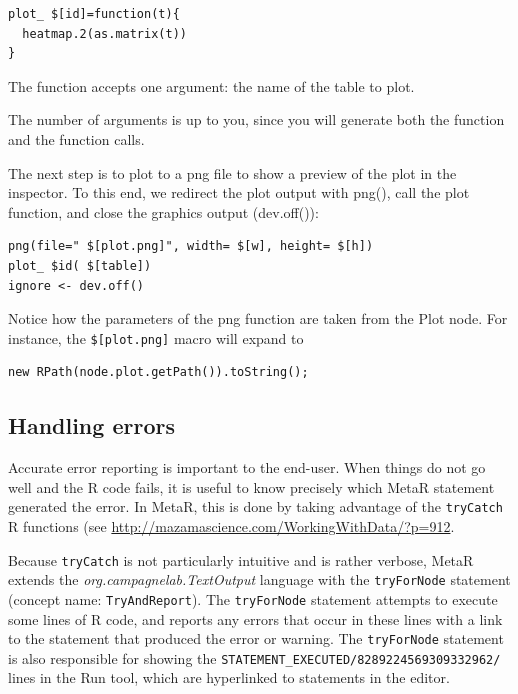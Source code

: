 \begin{lstlisting}
plot_ $[id]=function(t){                        
  heatmap.2(as.matrix(t)) 
}                                             
\end{lstlisting}

The function accepts one argument: the name of the table to plot. 

\begin{remark}
The number of arguments is up to you, since you will generate both the function and the function calls.

\end{remark}

The next step is to plot to a png file to show a preview of the plot in the inspector. To this end, we redirect the plot output with png(), call the plot function, and close the graphics output (dev.off()):

\begin{lstlisting}
png(file=" $[plot.png]", width= $[w], height= $[h])
plot_ $id( $[table])                           
ignore <- dev.off()                          
\end{lstlisting}
Notice how the parameters of the png function are taken from the Plot node.
For instance, the \texttt{\$[plot.png]} macro will expand to 

\begin{lstlisting}
new RPath(node.plot.getPath()).toString();
\end{lstlisting}


\subsection{Handling errors}
Accurate error reporting is important to the end-user. When things do not go well and the R code fails, it is useful to know precisely which MetaR statement generated the error. In MetaR, this is done by taking advantage of the \texttt{tryCatch} R functions (see \url{http://mazamascience.com/WorkingWithData/?p=912}. 

Because \texttt{tryCatch} is not particularly intuitive and is rather verbose, MetaR extends the \textit{org.campagnelab.TextOutput} language with the \texttt{tryForNode} statement (concept name: \texttt{TryAndReport}). The \texttt{tryForNode} statement attempts to execute some lines of R code, and reports any errors that occur in these lines with a link to the statement that produced the error or warning. The \texttt{tryForNode} statement is also responsible for showing the \texttt{STATEMENT\_EXECUTED/\allowbreak{}8289224\allowbreak{}569309332962/} lines in the Run tool, which are hyperlinked to statements in the editor. 

